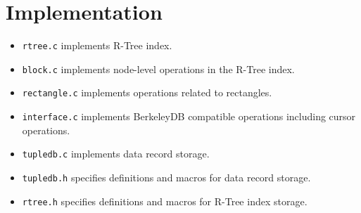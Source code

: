 \documentclass[12pt]{article}
\renewcommand{\baselinestretch}{1.2}
\begin{document}
\newcommand{\obselet}{
\newpage
Here is a graphical representation of data.db.
\renewcommand{\baselinestretch}{0.8}
\begin{verbatim}
+--+--+--------------+
|fb|tb|	             | supertuple
+--+--+--------------+
|data                | data tuple1
+--------------------+
|data                | data tuple2
+--------------------+
|                    |
+--------------------+
|                    |
+--------------------+
|                    |
+--------------------+
|        .           |
|        .           |
|        .           |
|        .           |
+--------------------+
|                    | data tuple
+--------------------+

- Under supertuple
  * fb means head of free block list. It points to the next free block.
  * tb means total number of blocks in current file

- Under a free tuple
  * The first integer is a pointer pointing to next free tuple in
    the free-chain.  If the pointer is 0, it means the end of the
    chain.  Then the next free tuple will be grabbed from the end
    of the storage file which is recorded in tb.
\end{verbatim}
}

\renewcommand{\baselinestretch}{1.2}



\section{Implementation}
\begin{itemize}
\item {\tt rtree.c} implements R-Tree index.
\item {\tt block.c} implements node-level operations in the R-Tree
      index.
\item {\tt rectangle.c} implements operations related to
      rectangles.
\item {\tt interface.c} implements BerkeleyDB compatible
      operations including cursor operations.
\item {\tt tupledb.c} implements data record storage.
\item {\tt tupledb.h} specifies definitions and macros for data
      record storage.
\item {\tt rtree.h} specifies definitions and macros for R-Tree
      index storage.
\end{itemize}
\end{document}
